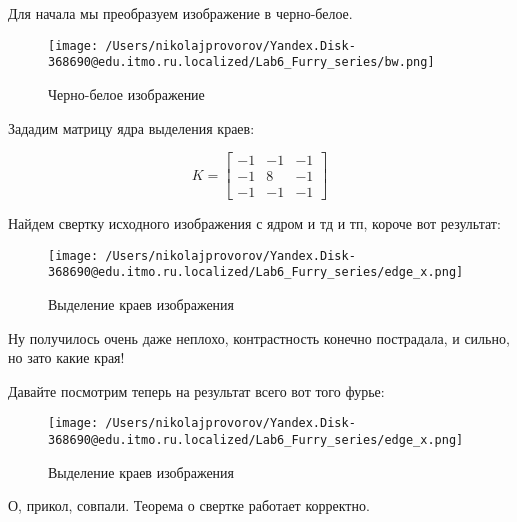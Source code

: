 Для начала мы преобразуем изображение в черно-белое.

\begin{figure}[ht!]
    \centering
    \texttt{[image: /Users/nikolajprovorov/Yandex.Disk-368690@edu.itmo.ru.localized/Lab6\_Furry\_series/bw.png]}
    \caption{Черно-белое изображение}
\end{figure}

Зададим матрицу ядра выделения краев:

\begin{equation}
    K = 
    \begin{bmatrix}
        -1 & -1 & -1 \\
        -1 & 8 & -1 \\
        -1 & -1 & -1
    \end{bmatrix}
\end{equation}

Найдем свертку исходного изображения с ядром и тд и тп, короче вот результат:

\clearpage

\begin{figure}[ht!]
    \centering
    \texttt{[image: /Users/nikolajprovorov/Yandex.Disk-368690@edu.itmo.ru.localized/Lab6\_Furry\_series/edge\_x.png]}
    \caption{Выделение краев изображения}
\end{figure}

Ну получилось очень даже неплохо, контрастность конечно пострадала, и сильно, но зато какие края!

Давайте посмотрим теперь на результат всего вот того фурье:

\begin{figure}[ht!]
    \centering
    \texttt{[image: /Users/nikolajprovorov/Yandex.Disk-368690@edu.itmo.ru.localized/Lab6\_Furry\_series/edge\_x.png]}
    \caption{Выделение краев изображения}
\end{figure}

О, прикол, совпали. Теорема о свертке работает корректно.